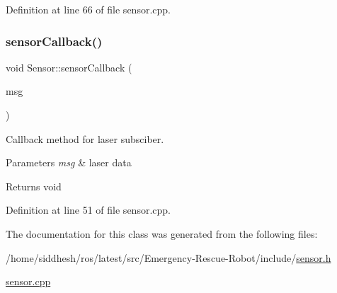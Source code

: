 Definition at line 66 of file sensor.\+cpp.

\mbox{\label{class_sensor_abc654feeb9c9b67efcda04b62072d828}} 
\subsubsection{\texorpdfstring{sensor\+Callback()}{sensorCallback()}}
{\footnotesize\ttfamily void Sensor\+::sensor\+Callback (\begin{DoxyParamCaption}\item[{const sensor\+\_\+msgs\+::\+Laser\+Scan\+::\+Const\+Ptr \&}]{msg }\end{DoxyParamCaption})}



Callback method for laser subsciber. 


\begin{DoxyParams}{Parameters}
{\em msg} & laser data \\
\hline
\end{DoxyParams}
\begin{DoxyReturn}{Returns}
void 
\end{DoxyReturn}


Definition at line 51 of file sensor.\+cpp.



The documentation for this class was generated from the following files\+:\begin{DoxyCompactItemize}
\item 
/home/siddhesh/ros/latest/src/\+Emergency-\/\+Rescue-\/\+Robot/include/\mbox{\hyperlink{sensor_8h}{sensor.\+h}}\item 
\mbox{\hyperlink{sensor_8cpp}{sensor.\+cpp}}\end{DoxyCompactItemize}
